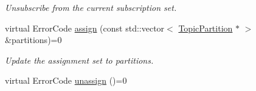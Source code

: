 \begin{DoxyCompactItemize}
\begin{DoxyCompactList}\small\item\em Unsubscribe from the current subscription set. \item\end{DoxyCompactList}\item 
virtual ErrorCode \hyperlink{classRdKafka_1_1KafkaConsumer_af3f872bcb7d46febbaea63518f854b46}{assign} (const std::vector$<$ \hyperlink{classRdKafka_1_1TopicPartition}{TopicPartition} $\ast$ $>$ \&partitions)=0
\begin{DoxyCompactList}\small\item\em Update the assignment set to {\ttfamily partitions}. \item\end{DoxyCompactList}\item 
\hypertarget{classRdKafka_1_1KafkaConsumer_a21dc83bc3eb00e2b4e0f6373244976b6}{
virtual ErrorCode \hyperlink{classRdKafka_1_1KafkaConsumer_a21dc83bc3eb00e2b4e0f6373244976b6}{unassign} ()=0}
\label{classRdKafka_1_1KafkaConsumer_a21dc83bc3eb00e2b4e0f6373244976b6}


\end{DoxyCompactItemize}
